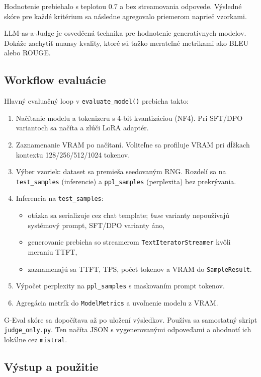 Hodnotenie prebiehalo s teplotou 0.7 a bez streamovania odpovede. Výsledné skóre pre každé kritérium sa následne agregovalo priemerom naprieč vzorkami.
 
LLM-as-a-Judge je osvedčená technika pre hodnotenie generatívnych modelov. Dokáže zachytiť nuansy kvality, ktoré sú ťažko merateľné metrikami ako BLEU alebo ROUGE.
 
\subsection{Workflow evaluácie}
 
Hlavný evaluačný loop v \texttt{evaluate\_model()} prebieha takto:
\begin{enumerate}
    \item Načítanie modelu a tokenizeru s 4-bit kvantizáciou (NF4). Pri SFT/DPO variantoch sa načíta a zlúči LoRA adaptér.
    \item Zaznamenanie VRAM po načítaní. Voliteľne sa profiluje VRAM pri dĺžkach kontextu 128/256/512/1024 tokenov.
    \item Výber vzoriek: dataset sa premieša seedovaným RNG. Rozdelí sa na \texttt{test\_samples} (inferencie) a \texttt{ppl\_samples} (perplexita) bez prekrývania.
    \item Inferencia na \texttt{test\_samples}:
    \begin{itemize}
        \item otázka sa serializuje cez chat template; \emph{base} varianty nepoužívajú systémový prompt, SFT/DPO varianty áno,
        \item generovanie prebieha so streamerom \texttt{TextIteratorStreamer} kvôli meraniu TTFT,
        \item zaznamenajú sa TTFT, TPS, počet tokenov a VRAM do \texttt{SampleResult}.
    \end{itemize}
    \item Výpočet perplexity na \texttt{ppl\_samples} s maskovaním prompt tokenov.
    \item Agregácia metrík do \texttt{ModelMetrics} a uvoľnenie modelu z VRAM.
\end{enumerate}
 
G-Eval skóre sa dopočítava až po uložení výsledkov. Používa sa samostatný skript \texttt{judge\_only.py}. Ten načíta JSON s vygenerovanými odpoveďami a ohodnotí ich lokálne cez \texttt{mistral}.
 
\subsection{Výstup a použitie}
 
